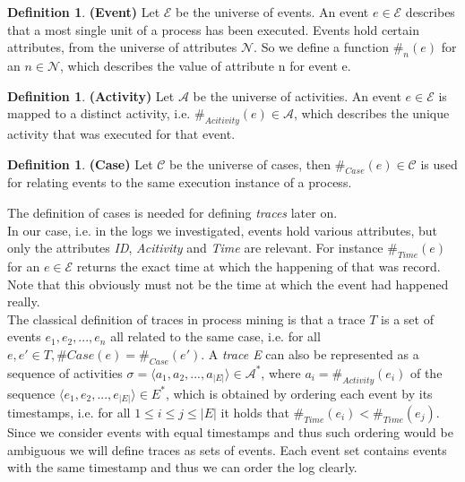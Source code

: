 \documentclass[
	a4paper,
	pagesize,
	pdftex,
	12pt,
	ngerman,
	fleqn,
	final,
	]{scrartcl}
\theoremstyle{plain}
\theoremstyle{definition}
\newtheorem{defn}[thm]{Definition}
\begin{document}
		\begin{defn}{\textbf{(Event)}}
			Let \( \mathcal{E}\) be the universe of events. An event \(e \in \mathcal{E}\) describes that a most single unit of a process has been executed. Events hold certain attributes, from the universe of attributes \(\mathcal{N}\). So we define a function \(\#_n(e)\) for an \(n \in \mathcal{N}\), which describes the value of attribute n for event e. 
		\end{defn}

		\begin{defn}{\textbf{(Activity)}}
			Let \(\mathcal{A}\) be the universe of activities. An event \(e \in \mathcal{E}\) is mapped to a distinct activity, i.e. \(\#_{Acitivity}(e) \in \mathcal{A}\), which describes the unique activity that was executed for that event.
		\end{defn}

		\begin{defn}{\textbf{(Case)}}
			Let \(\mathcal{C}\) be the universe of cases, then \(\#_{Case}(e) \in \mathcal{C}\) is used for relating events to the same execution instance of a process.  
		\end{defn}

		The definition of cases is needed for defining \textit{traces} later on.\\
		In our case, i.e. in the logs we investigated, events hold various attributes, but only the attributes \textit{ID}, \textit{Acitivity} and \textit{Time} are relevant. For instance \(\#_{Time}(e)\) for an \(e \in \mathcal{E}\) returns the exact time at which the happening of that was record. Note that this obviously must not be the time at which the event had happened really. \\
		
		The classical definition of traces in process mining is that a trace \(T\) is a set of events \(e_1, e_2, ..., e_n\) all related to the same case, i.e. for all \(e, e' \in T, \#{Case}(e) = \#_{Case}(e') \).
		A \textit{trace E} can also be represented as a sequence of activities \(\sigma = \langle a_1,a_2,...,a_{|E|} \rangle \in \mathcal{A}^*\), where \(a_i = \#_{Activity}(e_i)\) of the sequence \(\langle e_1,e_2,...,e_{|E|} \rangle \in E^*\), which is obtained by ordering each event by its timestamps, i.e. for all \(1 \leq i \leq j \leq |E|\) it holds that \(\#_{Time}(e_i) < \#_{Time}(e_j)\). \\
		Since we consider events with equal timestamps and thus such ordering would be ambiguous we will define traces as sets of events. Each event set contains events with the same timestamp and thus we can order the log clearly. \\
\end{document}
